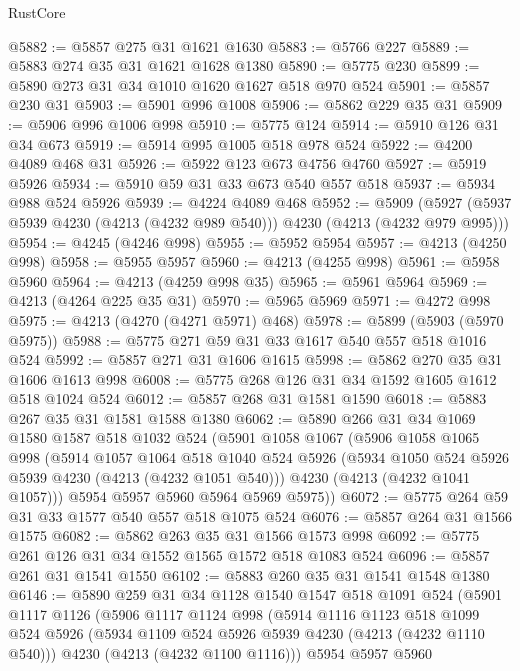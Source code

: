\begin{lexlean}{RustCore}
\begin{coremodule}
@5882 := @5857 @275 @31 @1621 @1630
@5883 := @5766 @227
@5889 := @5883 @274 @35 @31 @1621 @1628 @1380
@5890 := @5775 @230
@5899 := @5890 @273 @31 @34 @1010 @1620 @1627 @518 @970 @524
@5901 := @5857 @230 @31
@5903 := @5901 @996 @1008
@5906 := @5862 @229 @35 @31
@5909 := @5906 @996 @1006 @998
@5910 := @5775 @124
@5914 := @5910 @126 @31 @34 @673
@5919 := @5914 @995 @1005 @518 @978 @524
@5922 := @4200 @4089 @468 @31
@5926 := @5922 @123 @673 @4756 @4760
@5927 := @5919 @5926
@5934 := @5910 @59 @31 @33 @673 @540 @557 @518
@5937 := @5934 @988 @524 @5926
@5939 := @4224 @4089 @468
@5952 := @5909 (@5927 (@5937 @5939 @4230 (@4213 (@4232 @989 @540))) @4230 (@4213 (@4232 @979 @995)))
@5954 := @4245 (@4246 @998)
@5955 := @5952 @5954
@5957 := @4213 (@4250 @998)
@5958 := @5955 @5957
@5960 := @4213 (@4255 @998)
@5961 := @5958 @5960
@5964 := @4213 (@4259 @998 @35)
@5965 := @5961 @5964
@5969 := @4213 (@4264 @225 @35 @31)
@5970 := @5965 @5969
@5971 := @4272 @998
@5975 := @4213 (@4270 (@4271 @5971) @468)
@5978 := @5899 (@5903 (@5970 @5975))
@5988 := @5775 @271 @59 @31 @33 @1617 @540 @557 @518 @1016 @524
@5992 := @5857 @271 @31 @1606 @1615
@5998 := @5862 @270 @35 @31 @1606 @1613 @998
@6008 := @5775 @268 @126 @31 @34 @1592 @1605 @1612 @518 @1024 @524
@6012 := @5857 @268 @31 @1581 @1590
@6018 := @5883 @267 @35 @31 @1581 @1588 @1380
@6062 := @5890
    @266
    @31
    @34
    @1069
    @1580
    @1587
    @518
    @1032
    @524
    (@5901
      @1058
      @1067
      (@5906
        @1058
        @1065
        @998
        (@5914
          @1057
          @1064
          @518
          @1040
          @524
          @5926
          (@5934 @1050 @524 @5926 @5939 @4230 (@4213 (@4232 @1051 @540)))
          @4230
          (@4213 (@4232 @1041 @1057)))
        @5954
        @5957
        @5960
        @5964
        @5969
        @5975))
@6072 := @5775 @264 @59 @31 @33 @1577 @540 @557 @518 @1075 @524
@6076 := @5857 @264 @31 @1566 @1575
@6082 := @5862 @263 @35 @31 @1566 @1573 @998
@6092 := @5775 @261 @126 @31 @34 @1552 @1565 @1572 @518 @1083 @524
@6096 := @5857 @261 @31 @1541 @1550
@6102 := @5883 @260 @35 @31 @1541 @1548 @1380
@6146 := @5890
    @259
    @31
    @34
    @1128
    @1540
    @1547
    @518
    @1091
    @524
    (@5901
      @1117
      @1126
      (@5906
        @1117
        @1124
        @998
        (@5914
          @1116
          @1123
          @518
          @1099
          @524
          @5926
          (@5934 @1109 @524 @5926 @5939 @4230 (@4213 (@4232 @1110 @540)))
          @4230
          (@4213 (@4232 @1100 @1116)))
        @5954
        @5957
        @5960

\end{coremodule}
\end{lexlean}
